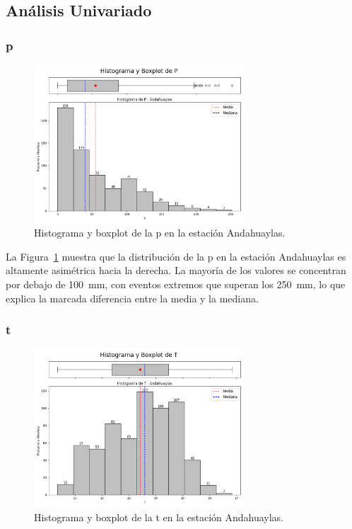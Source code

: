 \subsection{Análisis Univariado}

\subsubsection*{\gls{p} }
\begin{figure}[htbp]
\centering
\includegraphics[width=0.7\textwidth]{resultados/por_estacion_meteorologica/Andahuaylas/P_histograma.png}
\caption{Histograma y boxplot de la \gls{p}  en la estación Andahuaylas.}
\label{fig:andahuaylas_P}
\end{figure}

La Figura~\ref{fig:andahuaylas_P} muestra que la distribución de la \gls{p} en la estación Andahuaylas es altamente asimétrica hacia la derecha. La mayoría de los valores se concentran por debajo de 100~mm, con eventos extremos que superan los 250~mm, lo que explica la marcada diferencia entre la media y la mediana.


\subsubsection*{\gls{t} }
\begin{figure}[htbp]
\centering
\includegraphics[width=0.7\textwidth]{resultados/por_estacion_meteorologica/Andahuaylas/T_histograma.png}
\caption{Histograma y boxplot de la \gls{t}  en la estación Andahuaylas.}
\label{fig:andahuaylas_T}
\end{figure}

